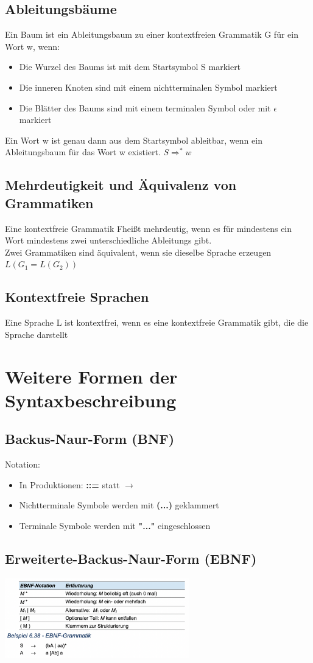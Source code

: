 \documentclass{scrreprt}
\begin{document}
\subsection{Ableitungsbäume}
Ein Baum ist ein Ableitungsbaum zu einer kontextfreien Grammatik G für ein Wort w, wenn:
\begin{itemize}
    \item Die Wurzel des Baums ist mit dem Startsymbol S markiert
    \item Die inneren Knoten sind mit einem nichtterminalen Symbol markiert
    \item Die Blätter des Baums sind mit einem terminalen Symbol oder mit $\epsilon$ markiert
\end{itemize}
Ein Wort w ist genau dann aus dem Startsymbol ableitbar, wenn ein Ableitungsbaum für das Wort w existiert. $S \Rightarrow ^{*} w$
\subsection{Mehrdeutigkeit und Äquivalenz von Grammatiken}
Eine kontextfreie Grammatik Fheißt mehrdeutig, wenn es für mindestens ein Wort mindestens zwei unterschiedliche Ableitungs gibt.
\\Zwei Grammatiken sind äquivalent, wenn sie dieselbe Sprache erzeugen $L(G_{1}=L(G_{2}))$
\subsection{Kontextfreie Sprachen}
Eine Sprache L ist kontextfrei, wenn es eine kontextfreie Grammatik gibt, die die Sprache darstellt
\section{Weitere Formen der Syntaxbeschreibung}
\subsection{Backus-Naur-Form (BNF)}
Notation:
\begin{itemize}
    \item In Produktionen: \textbf{::=} statt \textbf{$\rightarrow$}
    \item Nichtterminale Symbole werden mit \textbf{(...)} geklammert
    \item Terminale Symbole werden mit \textbf{"..."} eingeschlossen
\end{itemize}
\subsection{Erweiterte-Backus-Naur-Form (EBNF)}
\includegraphics[width=0.6\textwidth]{"graphics/EBNF"}
\end{document}
